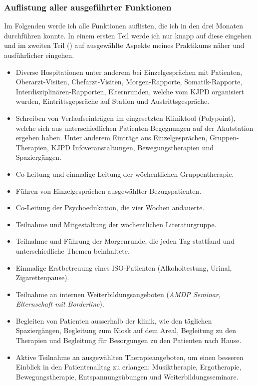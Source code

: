 \subsubsection{Auflistung aller ausgeführter Funktionen}
Im Folgenden werde ich alle Funktionen auflisten, die ich in den drei Monaten durchführen konnte. In einem ersten Teil werde ich nur knapp auf diese eingehen und im zweiten Teil () auf ausgewählte Aspekte meines Praktikums näher und ausführlicher eingehen.
\begin{itemize}
        \item Diverse Hospitationen unter anderem bei Einzelgesprächen mit Patienten, Oberarzt-Visiten, Chefarzt-Visiten, Morgen-Rapporte, Somatik-Rapporte, Interdisziplinären-Rapporten, Elternrunden, welche vom KJPD organisiert wurden, Eintrittsgepsräche auf Station und Austrittsgespräche.
        \item Schreiben von Verlaufseinträgen im eingesetzten Kliniktool (Polypoint), welche sich aus unterschiedlichen Patienten-Begegnungen auf der Akutstation ergeben haben. Unter anderem Einträge aus Einzelgesprächen, Gruppen-Therapien, KJPD Infoveranstaltungen, Bewegungstherapien und Spaziergängen.
        \item Co-Leitung und einmalige Leitung der wöchentlichen Gruppentherapie.
        \item Führen von Einzelgesprächen ausgewählter Bezugspatienten.
        \item Co-Leitung der Psychoedukation, die vier Wochen andauerte.
        \item Teilnahme und Mitgestaltung der wöchentlichen Literaturgruppe.
        \item Teilnahme und Führung der Morgenrunde, die jeden Tag stattfand und unterschiedliche Themen beinhaltete.
        \item Einmalige Erstbetreuung eines ISO-Patienten (Alkoholtestung, Urinal, Zigarettenpause).
        \item Teilnahme an internen Weiterbildungsangeboten (\textit{AMDP Seminar, Elternschaft mit Borderline}).
        \item Begleiten von Patienten ausserhalb der klinik, wie den täglichen Spaziergängen, Begleitung zum Kiosk auf dem Areal, Begleitung zu den Therapien und Begleitung für Besorgungen zu den Patienten nach Hause.
        \item Aktive Teilnahme an ausgewählten Therapieangeboten, um einen besseren Einblick in den Patientenalltag zu erlangen: Musiktherapie, Ergotherapie, Bewegungstherapie, Entspannungsübungen und Weiterbildungsseminare.
    \end{itemize}